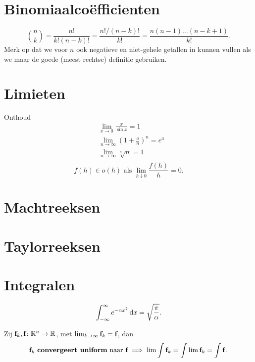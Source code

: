 \documentclass{article}
\begin{document}
    \tableofcontents
    \newpage

    \section{Binomiaalco\"efficienten}\label{sec:binomiaalco"efficienten}

    \[
        \binom n k = \frac{n!}{k! (n-k)!} = \frac{n! / (n-k)!}{k!} = \frac{n (n-1) \dots (n-k+1)}{k!}.
    \]
    Merk op dat we voor $n$ ook negatieve en niet-gehele getallen in kunnen vullen als we maar de goede (meest rechtse) definitie gebruiken.

    \section{Limieten}\label{sec:limieten}
    Onthoud
    \begin{align*}
        &\lim_{x\to 0} \frac{x}{\sin x} = 1 \\
        &\lim_{n \to \infty} \left( 1 + \frac a n \right)^n = e^a \\
        &\lim_{n \to \infty} \sqrt[n]{n} = 1 \\
    \end{align*}
    \[
        f(h) \in o(h) \text{ als } \lim_{h \downarrow 0} \frac{f(h)}{h} = 0.
    \]
    \section{Machtreeksen}\label{sec:sommen}
    

    \section{Taylorreeksen}\label{sec:taylorreeksen}
    

    \section{Integralen}\label{sec:integralen}

    \begin{stelling}
        \[ \int_{-\infty}^\infty e^{-\alpha x^2} \mathop{}\!\mathrm{d} x = \sqrt {\frac \pi \alpha}.\]
    \end{stelling}

    \begin{stelling}
        Zij ${\textbf{f}}_k,{\textbf{f}} \colon \mathbb{R}^n \to \mathbb{R}$, met $\lim_{k \to \infty} {\textbf{f}}_k = {\textbf{f}}$, dan
        \[ {\textbf{f}}_k \text { \textbf{convergeert uniform} naar } {\textbf{f}} \implies \lim \int {\textbf{f}}_k = \int \lim {\textbf{f}}_k = \int {\textbf{f}} \,. \]
    \end{stelling}
\end{document}
